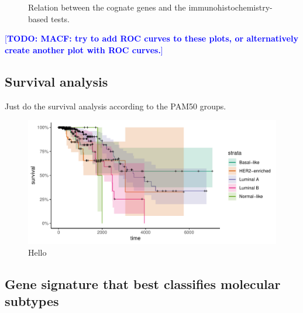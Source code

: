 \documentclass[10pt,twocolumn]{article}\usepackage[]{graphicx}\usepackage[]{color}
\makeatletter
\def\maxwidth{ %
  \ifdim\Gin@nat@width>\linewidth
    \linewidth
  \else
    \Gin@nat@width
  \fi
}
\newenvironment{knitrout}{}{} %
\newcommand{\todo}[1]{\textcolor{blue}{[\textbf{TODO: #1}]} }
\makeatother
\begin{document}
\begin{knitrout}
\begin{figure}[ht]
{}

\caption[Relation between the cognate genes and the immunohistochemistry-based tests]{Relation between the cognate genes and the immunohistochemistry-based tests.}\label{fig:3a}
\end{figure}


\end{knitrout}

\todo{MACF: try to add ROC curves to these plots, or alternatively create another plot with ROC curves.}

\subsection{Survival analysis} %
Just do the survival analysis according to the PAM50 groups.

\begin{knitrout}
\color{fgcolor}\begin{figure}[ht]

{\centering \includegraphics[width=\maxwidth]{figure/survival-1} 

}

\caption[Hello]{Hello}\label{fig:survival}
\end{figure}


\end{knitrout}

\subsection{Gene signature that best classifies molecular subtypes} %
\end{document}
